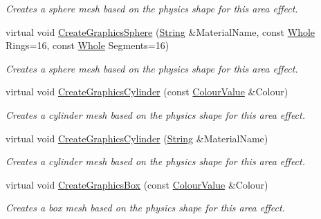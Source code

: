 \begin{DoxyCompactItemize}
\begin{DoxyCompactList}\small\item\em Creates a sphere mesh based on the physics shape for this area effect. \item\end{DoxyCompactList}\item 
virtual void \hyperlink{classphys_1_1AreaEffect_ae2640c1eb9e05e4db0c4544d31aa2c0c}{CreateGraphicsSphere} (\hyperlink{namespacephys_aa03900411993de7fbfec4789bc1d392e}{String} \&MaterialName, const \hyperlink{namespacephys_a460f6bc24c8dd347b05e0366ae34f34a}{Whole} Rings=16, const \hyperlink{namespacephys_a460f6bc24c8dd347b05e0366ae34f34a}{Whole} Segments=16)
\begin{DoxyCompactList}\small\item\em Creates a sphere mesh based on the physics shape for this area effect. \item\end{DoxyCompactList}\item 
virtual void \hyperlink{classphys_1_1AreaEffect_af9a44284ceb691fdd21e4fc01811f04d}{CreateGraphicsCylinder} (const \hyperlink{classphys_1_1ColourValue}{ColourValue} \&Colour)
\begin{DoxyCompactList}\small\item\em Creates a cylinder mesh based on the physics shape for this area effect. \item\end{DoxyCompactList}\item 
virtual void \hyperlink{classphys_1_1AreaEffect_ae954c00e62d7ee883148f1990d0d0a48}{CreateGraphicsCylinder} (\hyperlink{namespacephys_aa03900411993de7fbfec4789bc1d392e}{String} \&MaterialName)
\begin{DoxyCompactList}\small\item\em Creates a cylinder mesh based on the physics shape for this area effect. \item\end{DoxyCompactList}\item 
virtual void \hyperlink{classphys_1_1AreaEffect_a12655c60d5461ef6053c8bdd5cc9afea}{CreateGraphicsBox} (const \hyperlink{classphys_1_1ColourValue}{ColourValue} \&Colour)
\begin{DoxyCompactList}\small\item\em Creates a box mesh based on the physics shape for this area effect. \item\end{DoxyCompactList}\item 

\end{DoxyCompactItemize}
